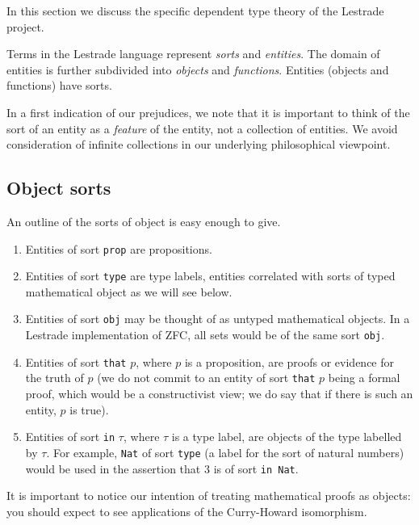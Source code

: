 \documentclass[12pt]{article}
\begin{document}
In this section we discuss the specific dependent type theory of the Lestrade project.  

Terms in the Lestrade language represent {\em sorts\/} and {\em entities\/}.  The domain of entities is further subdivided into {\em objects\/} and {\em functions\/}.  Entities (objects and functions) have sorts.  

In a first indication of our prejudices, we note that it is important to think of the sort of an entity as a {\em feature\/} of the entity, not a collection of entities.  We avoid consideration of infinite collections in our underlying philosophical viewpoint.

\subsection{Object sorts}

An outline of the sorts of object is easy enough to give.  

\begin{enumerate}

\item  Entities of sort {\tt prop} are propositions.

\item  Entities of sort {\tt type} are type labels, entities correlated with sorts of typed mathematical object as we will see below.

\item  Entities of sort {\tt obj} may be thought of as untyped mathematical objects.  In a Lestrade implementation of ZFC, all sets would be of the same sort {\tt obj}.

\item  Entities of sort {\tt that} $p$, where $p$ is a proposition, are proofs or evidence for the truth of $p$ (we do not commit to an entity of sort {\tt that} $p$ being a formal proof, which would be a constructivist view;  we do say that if there is such an entity, $p$ is true).

\item Entities of sort {\tt in} $\tau$, where $\tau$ is a type label, are objects of the type labelled by $\tau$.  For example, {\tt Nat} of sort {\tt type}
(a label for the sort of natural numbers) would be used in the assertion that $3$ is of sort {\tt in Nat}.

\end{enumerate}

It is important to notice our intention of treating mathematical proofs as objects:  you should expect to see applications of the Curry-Howard isomorphism.
\end{document}
